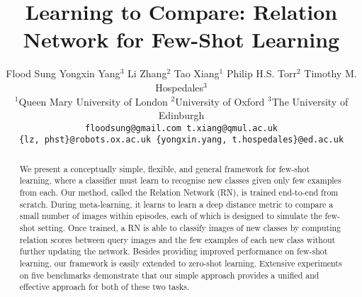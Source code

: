 \documentclass[10pt,twocolumn,letterpaper]{article}
\begin{document}
\title{Learning to Compare: Relation Network for Few-Shot Learning}

\author{Flood Sung \quad Yongxin Yang$^3$  \quad Li Zhang$^2$ \quad  Tao Xiang$^{1}$ \quad   Philip H.S. Torr$^{2}$  \quad  Timothy M. Hospedales$^{3}$\\
$^1$Queen Mary University of London \quad $^2$University of Oxford \quad $^3$The University of Edinburgh\\
{\tt\small floodsung@gmail.com \quad t.xiang@qmul.ac.uk} \\ 
{\tt\small \{lz, phst\}@robots.ox.ac.uk \quad \{yongxin.yang, t.hospedales\}@ed.ac.uk}
}

\maketitle
\thispagestyle{empty}

\begin{abstract}

We present a conceptually simple, flexible, and general framework for few-shot learning, where a classifier must learn to recognise new classes given only few examples from each. Our method, called the Relation Network (RN), is trained end-to-end from scratch. During meta-learning, it learns to learn a deep distance metric to compare a small number of images within episodes, each of which is designed to simulate the few-shot setting. 
Once trained, a RN is able to classify images of new classes by computing relation scores between query images and the few examples of each new class without further updating the network. 
Besides providing improved performance on few-shot learning, our framework is easily extended to zero-shot learning. Extensive experiments on five benchmarks demonstrate that our simple approach provides a unified and effective approach for both of these two tasks. 
\end{abstract}
\end{document}
